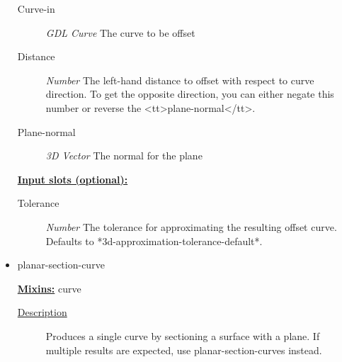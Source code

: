 \documentclass [11pt]{book}
\begin{document}
\begin{itemize}
\begin{description}
\item [Curve-in]
\emph{GDL Curve} The curve to be offset


\item [Distance]
\emph{Number} The left-hand distance to offset with respect to curve direction. To get the opposite
direction, you can either negate this number or reverse the <tt>plane-normal</tt>.


\item [Plane-normal]
\emph{3D Vector} The normal for the plane


\end{description}






\textbf{
\underline{Input slots (optional):}}

\begin{description}

\item [Tolerance]
\emph{Number} The tolerance for approximating the resulting offset curve.
Defaults to *3d-approximation-tolerance-default*.


\end{description}







\item {}planar-section-curve


\textbf{
\underline{Mixins:}} curve





\begin{description}

\item [
\underline{Description}]


Produces a single curve by sectioning a surface with a plane. If multiple results are expected,
use planar-section-curves instead.



\end{description}




\begin{figure}
\begin{lrbox}{\boxedverb}
\begin{minipage}{\linewidth}
{\small

}
\end{minipage}
\end{lrbox}
\end{figure}
\end{itemize}
\end{document}
